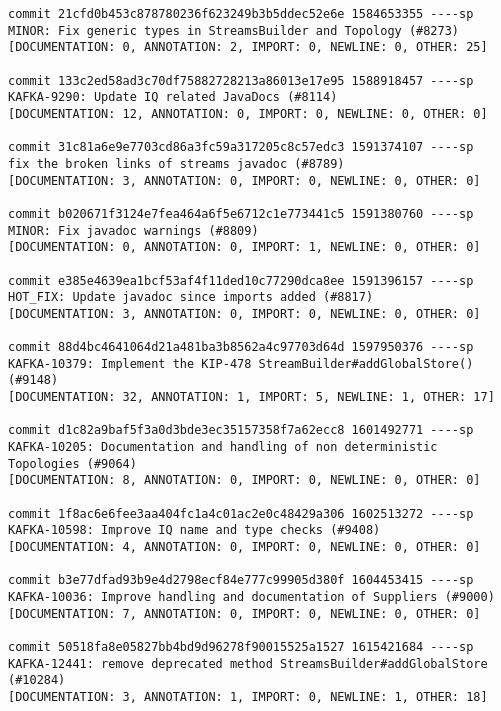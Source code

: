 \begin{lstlisting}
commit 21cfd0b453c878780236f623249b3b5ddec52e6e 1584653355 ----sp
MINOR: Fix generic types in StreamsBuilder and Topology (#8273)                                     
[DOCUMENTATION: 0, ANNOTATION: 2, IMPORT: 0, NEWLINE: 0, OTHER: 25]

commit 133c2ed58ad3c70df75882728213a86013e17e95 1588918457 ----sp
KAFKA-9290: Update IQ related JavaDocs (#8114)                                                      
[DOCUMENTATION: 12, ANNOTATION: 0, IMPORT: 0, NEWLINE: 0, OTHER: 0]

commit 31c81a6e9e7703cd86a3fc59a317205c8c57edc3 1591374107 ----sp
fix the broken links of streams javadoc (#8789)                                                     
[DOCUMENTATION: 3, ANNOTATION: 0, IMPORT: 0, NEWLINE: 0, OTHER: 0]

commit b020671f3124e7fea464a6f5e6712c1e773441c5 1591380760 ----sp
MINOR: Fix javadoc warnings (#8809)                                                                 
[DOCUMENTATION: 0, ANNOTATION: 0, IMPORT: 1, NEWLINE: 0, OTHER: 0]

commit e385e4639ea1bcf53af4f11ded10c77290dca8ee 1591396157 ----sp
HOT_FIX: Update javadoc since imports added (#8817)                                                 
[DOCUMENTATION: 3, ANNOTATION: 0, IMPORT: 0, NEWLINE: 0, OTHER: 0]

commit 88d4bc4641064d21a481ba3b8562a4c97703d64d 1597950376 ----sp
KAFKA-10379: Implement the KIP-478 StreamBuilder#addGlobalStore() (#9148)                           
[DOCUMENTATION: 32, ANNOTATION: 1, IMPORT: 5, NEWLINE: 1, OTHER: 17]

commit d1c82a9baf5f3a0d3bde3ec35157358f7a62ecc8 1601492771 ----sp
KAFKA-10205: Documentation and handling of non deterministic Topologies (#9064)                     
[DOCUMENTATION: 8, ANNOTATION: 0, IMPORT: 0, NEWLINE: 0, OTHER: 0]

commit 1f8ac6e6fee3aa404fc1a4c01ac2e0c48429a306 1602513272 ----sp
KAFKA-10598: Improve IQ name and type checks (#9408)                                                
[DOCUMENTATION: 4, ANNOTATION: 0, IMPORT: 0, NEWLINE: 0, OTHER: 0]

commit b3e77dfad93b9e4d2798ecf84e777c99905d380f 1604453415 ----sp
KAFKA-10036: Improve handling and documentation of Suppliers (#9000)                                
[DOCUMENTATION: 7, ANNOTATION: 0, IMPORT: 0, NEWLINE: 0, OTHER: 0]

commit 50518fa8e05827bb4bd9d96278f90015525a1527 1615421684 ----sp
KAFKA-12441: remove deprecated method StreamsBuilder#addGlobalStore (#10284)                        
[DOCUMENTATION: 3, ANNOTATION: 1, IMPORT: 0, NEWLINE: 1, OTHER: 18]


\end{lstlisting}
